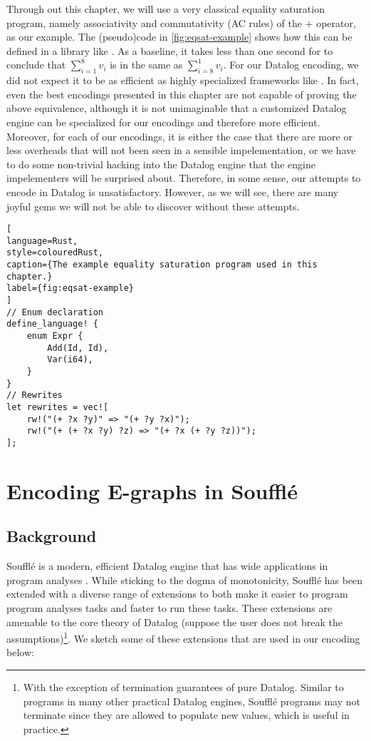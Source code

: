 Through out this chapter, we will use a very classical equality saturation program,
 namely associativity and commutativity (AC rules) of the $+$ operator, as our example.
The (pseudo)code in \autoref{fig:eqsat-example} shows how this can be defined in a library like \egg.
As a baseline, it takes less than one second for \egg to conclude that
 $\sum_{i=1}^{8}v_i$ is in the same \eclass as $\sum_{i=8}^{1}v_i$.
For our Datalog encoding,
 we did not expect it to be as efficient as highly specialized \egraph frameworks like \egg.
In fact, even the best encodings presented in this chapter
 are not capable of proving the above equivalence,
 although it is not unimaginable that a customized Datalog engine can be specialized
 for our \egraph encodings and therefore more efficient.
Moreover,
 for each of our encodings,
 it is either the case that there are more or less overheads 
 that will not been seen in a sensible \egraph impelementation,
 or we have to do some non-trivial hacking into the Datalog engine that 
 the engine impelementers will be surprised about.
Therefore, in some sense,
 our attempts to encode \egraphs in Datalog is unsatisfactory.
However, 
 as we will see,
 there are many joyful gems we will not be able to discover without these attempts.

\begin{lstlisting}[
language=Rust, 
style=colouredRust, 
caption={The example equality saturation program used in this chapter.}
label={fig:eqsat-example}
]
// Enum declaration
define_language! {
    enum Expr {
        Add(Id, Id),
        Var(i64),
    }
}
// Rewrites
let rewrites = vec![
    rw!("(+ ?x ?y)" => "(+ ?y ?x)");
    rw!("(+ (+ ?x ?y) ?z) => "(+ ?x (+ ?y ?z))");
];
\end{lstlisting}

\section{Encoding E-graphs in Souffl\'e}

\subsection{Background}

Souffl\'e is a modern, efficient Datalog engine 
 that has wide applications in program analyses \citep{doop, souffle, souffle-interpreter}.
While sticking to the dogma of monotonicity, 
 Souffl\'e has been extended with a diverse range of extensions
 to both make it easier to program program analyses tasks
 and faster to run these tasks.
These extensions are amenable to the core theory of Datalog 
 (suppose the user does not break the assumptions)\footnote{With the exception
 of termination guarantees of pure Datalog. 
 Similar to programs in many other practical Datalog engines, 
 Souffl\'e programs may not terminate
 since they are allowed to populate new values, which is useful in practice.}.
We sketch some of these extensions that are used in our encoding below:

